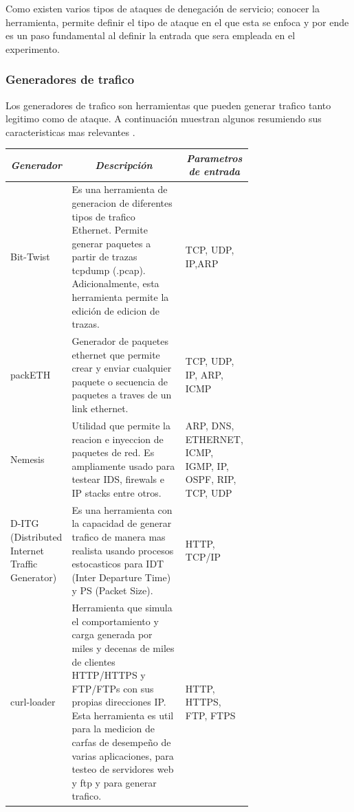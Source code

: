 \documentclass[12pt]{article}
\begin{document}
\FloatBarrier

Como existen varios tipos de ataques de denegación de servicio; conocer la herramienta, permite definir el tipo de ataque en el que esta se enfoca y por ende es un paso fundamental al definir la entrada que sera empleada en el experimento.

\subsubsection{Generadores de trafico}

Los generadores de trafico son herramientas que pueden generar trafico tanto legitimo como de ataque. A continuación muestran algunos resumiendo sus caracteristicas mas relevantes \citep{dos_tools}. 

\begin{table}[htbp]
\centering
\begin{tabular}{|p{0.1\linewidth}|p{0.5\linewidth}|p{0.1\linewidth}|}
\hline
\multicolumn{1}{|c|}{\textit{\textbf{Generador}}} & \multicolumn{1}{c|}{\textit{\textbf{Descripción}}} & \multicolumn{1}{c|}{\textit{\textbf{Parametros de entrada}}} \tabularnewline \hline
Bit-Twist & Es una herramienta de generacion de diferentes tipos de trafico Ethernet. Permite generar paquetes a partir de trazas tcpdump (.pcap). Adicionalmente, esta herramienta permite la edición de edicion de trazas.  
 & TCP, UDP, IP,ARP \tabularnewline \hline
packETH & Generador de paquetes ethernet que permite crear y enviar cualquier paquete o secuencia de paquetes a traves de un link ethernet.  
 & TCP, UDP, IP, ARP, ICMP \tabularnewline \hline
Nemesis & Utilidad que permite la reacion e inyeccion de paquetes de red. Es ampliamente usado para testear IDS, firewals e IP stacks entre otros.  
 & ARP, DNS, ETHERNET, ICMP, IGMP, IP, OSPF, RIP, TCP, UDP \tabularnewline \hline
D-ITG (Distributed Internet Traffic Generator) & Es una herramienta con la capacidad de generar trafico de manera mas realista usando procesos estocasticos para IDT (Inter Departure Time) y PS (Packet Size).  
 & HTTP, TCP/IP \tabularnewline \hline
curl-loader & Herramienta que simula el comportamiento y carga generada  por miles y decenas de miles de clientes HTTP/HTTPS y FTP/FTPs con sus propias direcciones IP. Esta herramienta es util para la medicion de carfas de desempeño de varias aplicaciones, para testeo de servidores web y ftp y para generar trafico. & HTTP, HTTPS, FTP, FTPS\tabularnewline \hline

\end{tabular}
\end{table}
\end{document}

